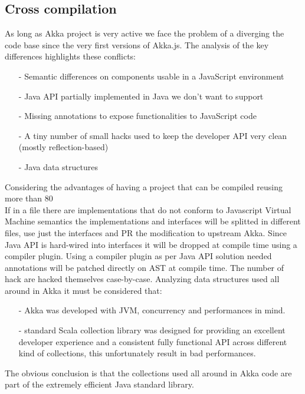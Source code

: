 \documentclass{sig-alternate}
\begin{document}
\subsection{Cross compilation}\label{sec:cross-compilation}

As long as Akka project is very active we face the problem of a diverging the code base since the very first versions of Akka.js.
The analysis of the key differences highlights these conflicts:
\begin{itemize}
	\item[-] Semantic differences on components usable in a JavaScript environment
	\item[-] Java API partially implemented in Java we don't want to support
	\item[-] Missing annotations to expose functionalities to JavaScript code
	\item[-] A tiny number of small hacks used to keep the developer API very clean (mostly reflection-based)
	\item[-] Java data structures
\end{itemize}
Considering the advantages of having a project that can be compiled reusing more than 80%
\\
If in a file there are implementations that do not conform to Javascript Virtual Machine semantics the implementations and interfaces will be splitted in different files, use just the interfaces and PR the modification to upstream Akka.
Since Java API is hard-wired into interfaces it will be dropped at compile time using a compiler plugin.
Using a compiler plugin as per Java API solution needed annotations will be patched directly on AST at compile time.
The number of hack are hacked themselves case-by-case.
Analyzing data structures used all around in Akka it must be considered that:
\begin{itemize}
	\item[-] Akka was developed with JVM, concurrency and performances in mind.
	\item[-] standard Scala collection library was designed for providing an excellent developer experience and a consistent fully functional API across different kind of collections, this unfortunately result in bad performances.
\end{itemize}
The obvious conclusion is that the collections used all around in Akka code are part of the extremely efficient Java standard library.
\end{document}
